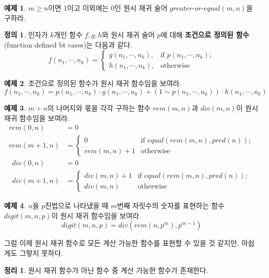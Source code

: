 \documentclass[b5paper]{book}
\theoremstyle{definition}
\newtheorem{defn}{정의}[chapter]
\newtheorem{thm}{정리}[chapter]
\newtheorem{ex}{예제}[chapter]
\begin{document}
\begin{ex}
    $m \ge n$이면 1이고 이외에는 0인 원시 재귀 술어 $greater\text{-}or\text{-}equal(m,n)$을 구하라.
\end{ex}
\begin{defn}
    인자가 $k$개인 함수 $f, g, h$와 원시 재귀 술어 $p$에 대해 
    \textbf{조건으로 정의된 함수}(function defined bt cases)는 다음과 같다.
    $$f(n_1, \cdots, n_k) = 
    \begin{cases}
        g(n_1, \cdots , n_k), & \text{if } p(n_1, \cdots, n_k); \\
        h(n_1, \cdots, n_k),  & \text{otherwise}
    \end{cases}$$
\end{defn}
\begin{ex}
    조건으로 정의된 함수가 원시 재귀 함수임을 보여라.
    $$f(n_1, \cdots, n_k) = p(n_1, \cdots, n_k) \cdot g(n_1, \cdots, n_k) +
    (1\sim p(n_1, \cdots, n_k)) \cdot h(n_1, \cdots, n_k)$$
\end{ex}
\begin{ex}
    $m \div n$의 나머지와 몫을 각각 구하는 함수 $rem(m,n)$과 $div(m,n)$이 원시 재귀 함수임을 보여라.  
    \begin{align*}
        rem(0,n) &= 0 \\
        rem(m+1, n) &= 
        \begin{cases}
            0 & \text{if } equal(rem(m,n), pred(n)); \\ 
            rem(m,n) + 1 & \text{otherwise}
        \end{cases} 
    \end{align*}
    \begin{align*}
        div(0,n) &= 0 \\
        div(m+1, n) &= 
        \begin{cases}
            div(m, n) + 1 & \text{if } equal(rem(m,n), pred(n)); \\ 
            div(m,n) & \text{otherwise}
        \end{cases} 
    \end{align*}
\end{ex}
\begin{ex}
    $n$을 $p$진법으로 나타냈을 때 $m$번째 자릿수의 숫자를 표현하는 함수 $digit(m,n,p)$이 원시 재귀 함수임을 보여라.
    $$digit(m,n,p) = div(rem(n,p^m), p^{m \sim 1})$$
\end{ex}
그럼 이제 원시 재귀 함수로 모든 계산 가능한 함수를 표현할 수 있을 것 같지만, 아쉽게도 그렇지 못하다.
\begin{thm}
    원시 재귀 함수가 아닌 함수 중 계산 가능한 함수가 존재한다.
\end{thm} 
\end{document}
